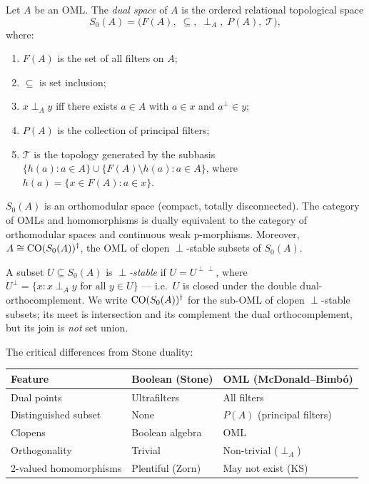 \begin{definition}
\label{def:oml-dual}
Let $A$ be an OML.  The \emph{dual space} of $A$ is the ordered
relational topological space
\[
  S_0(A) = \bigl(F(A),\; \subseteq,\; \perp_A,\; P(A),\; \mathcal{T}\bigr),
\]
where:
\begin{enumerate}[label=(\roman*)]
  \item $F(A)$ is the set of all filters on $A$;
  \item $\subseteq$ is set inclusion;
  \item $x \perp_A y$ iff there exists $a \in A$ with $a \in x$ and
    $a^\perp \in y$;
  \item $P(A)$ is the collection of principal filters;
  \item $\mathcal{T}$ is the topology generated by the subbasis
    $\{h(a) : a \in A\} \cup \{F(A) \setminus h(a) : a \in A\}$,
    where $h(a) = \{x \in F(A) : a \in x\}$.
\end{enumerate}
\end{definition}

\begin{theorem}
\label{thm:oml-duality}
$S_0(A)$ is an orthomodular space (compact, totally disconnected).
The category of OMLs and homomorphisms is dually equivalent to the
category of orthomodular spaces and continuous weak p-morphisms.
Moreover, $A \cong \mathrm{CO}(S_0(A))^\dagger$, the OML of clopen
$\perp$-stable subsets of $S_0(A)$.
\end{theorem}

\noindent
A subset $U \subseteq S_0(A)$ is \emph{$\perp$-stable} if
$U = U^{\perp\perp}$, where
$U^\perp = \{x : x \perp_A y \text{ for all } y \in U\}$ ---
i.e.\ $U$ is closed under the double dual-orthocomplement.
We write $\mathrm{CO}(S_0(A))^\dagger$ for the sub-OML of clopen
$\perp$-stable subsets; its meet is intersection and its complement the
dual orthocomplement, but its join is \emph{not} set union.

The critical differences from Stone duality:

\medskip
\begin{center}
\begin{tabular}{@{}lll@{}}
\toprule
Feature & Boolean (Stone) & OML (McDonald--Bimb\'{o}) \\
\midrule
Dual points & Ultrafilters & All filters \\
Distinguished subset & None & $P(A)$ (principal filters) \\
Clopens & Boolean algebra & OML \\
Orthogonality & Trivial & Non-trivial ($\perp_A$) \\
2-valued homomorphisms & Plentiful (Zorn) & May not exist (KS) \\
\bottomrule
\end{tabular}
\end{center}
\medskip

